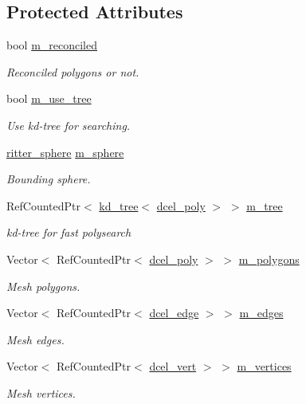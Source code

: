 \subsection*{Protected Attributes}
\begin{DoxyCompactItemize}
\item 
bool \hyperlink{classdcel__mesh_a93a9f77ca015481e814e69ba5aa31c71}{m\+\_\+reconciled}
\begin{DoxyCompactList}\small\item\em Reconciled polygons or not. \end{DoxyCompactList}\item 
bool \hyperlink{classdcel__mesh_a9ae4813711dd28edb74481426c53ff7f}{m\+\_\+use\+\_\+tree}
\begin{DoxyCompactList}\small\item\em Use kd-\/tree for searching. \end{DoxyCompactList}\item 
\hyperlink{classritter__sphere}{ritter\+\_\+sphere} \hyperlink{classdcel__mesh_a80f33c16d6a90f75f6c89353a489455f}{m\+\_\+sphere}
\begin{DoxyCompactList}\small\item\em Bounding sphere. \end{DoxyCompactList}\item 
Ref\+Counted\+Ptr$<$ \hyperlink{classkd__tree}{kd\+\_\+tree}$<$ \hyperlink{classdcel__poly}{dcel\+\_\+poly} $>$ $>$ \hyperlink{classdcel__mesh_a135bbb6ed1ef01831c3039aafab9c212}{m\+\_\+tree}
\begin{DoxyCompactList}\small\item\em kd-\/tree for fast polysearch \end{DoxyCompactList}\item 
Vector$<$ Ref\+Counted\+Ptr$<$ \hyperlink{classdcel__poly}{dcel\+\_\+poly} $>$ $>$ \hyperlink{classdcel__mesh_a6154bc0757610ec645ed91d998823ded}{m\+\_\+polygons}
\begin{DoxyCompactList}\small\item\em Mesh polygons. \end{DoxyCompactList}\item 
Vector$<$ Ref\+Counted\+Ptr$<$ \hyperlink{classdcel__edge}{dcel\+\_\+edge} $>$ $>$ \hyperlink{classdcel__mesh_aee4d618405ac6050237cc3b26c3024ec}{m\+\_\+edges}
\begin{DoxyCompactList}\small\item\em Mesh edges. \end{DoxyCompactList}\item 
Vector$<$ Ref\+Counted\+Ptr$<$ \hyperlink{classdcel__vert}{dcel\+\_\+vert} $>$ $>$ \hyperlink{classdcel__mesh_a42ad893d992ebf3efa5b5ca6e8dce4fb}{m\+\_\+vertices}
\begin{DoxyCompactList}\small\item\em Mesh vertices. \end{DoxyCompactList}\end{DoxyCompactItemize}



